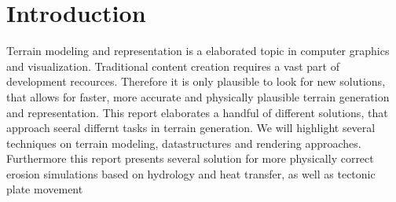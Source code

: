 \section{Introduction}
Terrain modeling and representation is a elaborated topic in computer graphics and visualization. Traditional content creation requires a vast part of development recources. Therefore it is only plausible to look for new solutions, that allows for faster, more accurate and physically plausible terrain generation and representation. This report elaborates a handful of different solutions, that approach seeral differnt tasks in terrain generation. 
We will highlight several techniques on terrain modeling, datastructures and rendering approaches. 
Furthermore this report presents several solution for more physically correct erosion simulations based on hydrology and heat transfer, as well as tectonic plate movement
